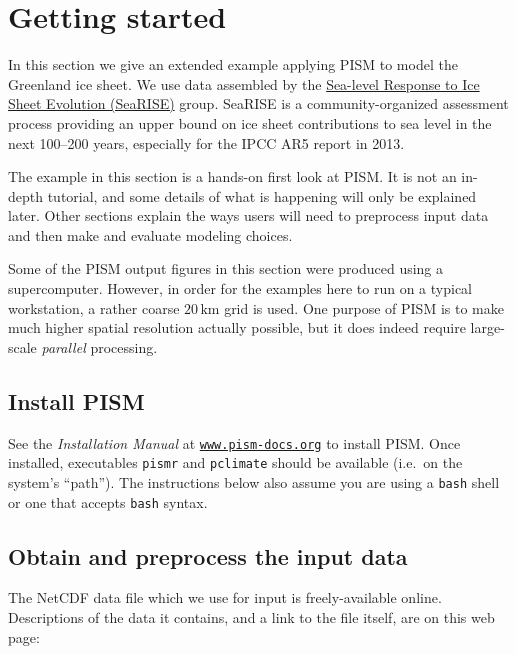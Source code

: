 
\section{Getting started}\label{sect:start}

In this section we give an extended example applying PISM to model the Greenland ice sheet.  We use data assembled by the \href{http://websrv.cs.umt.edu/isis/index.php/SeaRISE_Assessment}{Sea-level Response to Ice Sheet Evolution (SeaRISE)} group.  SeaRISE is a community-organized assessment process providing an upper bound on ice sheet contributions to sea level in the next 100--200 years, especially for the IPCC AR5 report in 2013.

The example in this section is a hands-on first look at PISM.  It is not an in-depth tutorial, and some details of what is happening will only be explained later.  Other sections explain the ways users will need to preprocess input data and then make and evaluate modeling choices.

Some of the PISM output figures in this section were produced using a supercomputer.  However, in order for the examples here to run on a typical workstation, a rather coarse $20\,\textrm{km}$ grid is used.  One purpose of PISM is to make much higher spatial resolution actually possible, but it does indeed require large-scale \emph{parallel} processing.


\subsection{Install PISM}

See the \emph{Installation Manual} at \href{http://www.pism-docs.org}{\texttt{www.pism-docs.org}}
to install PISM.  Once installed, executables \texttt{pismr} and \texttt{pclimate} should be available (i.e.~on the system's ``path'').  The instructions below also assume you are using a \texttt{bash} shell or one that accepts \texttt{bash} syntax.


\subsection{Obtain and preprocess the input data}

The NetCDF data file which we use for input is freely-available online.  Descriptions of the data it contains, and a link to the file itself, are on this web page: 
\medskip

\centerline{}
\medskip

